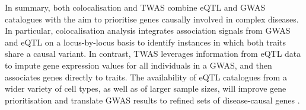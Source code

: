 
In summary, both colocalisation and TWAS combine eQTL and GWAS catalogues with the aim to prioritise genes causally involved in complex diseases.
In particular, colocalisation analysis integrates association signals from GWAS and eQTL on a locus-by-locus basis to identify instances in which both traits share a causal variant. 
In contrast, TWAS leverages information from eQTL data to impute gene expression values for all individuals in a GWAS, and then associates genes directly to traits. 
The availability of eQTL catalogues from a wider variety of cell types, as well as of larger sample sizes, will improve gene prioritisation and translate GWAS results to refined sets of disease-causal genes \cite{cano2020gwas}.



